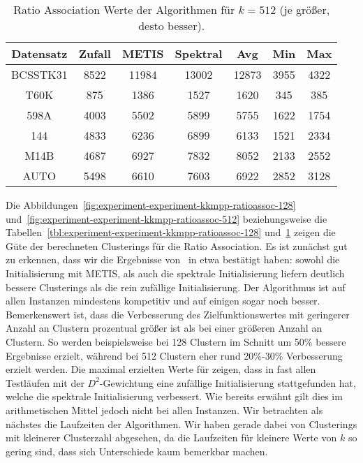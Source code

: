 \begin{table}[h!]
\centering
\begin{tabular}{@{}ccccccc@{}} \toprule
	\textbf{Datensatz} & \textbf{Zufall} & \textbf{METIS} & \textbf{Spektral} & \textbf{Avg} & \textbf{Min} & \textbf{Max} \\ \midrule
	BCSSTK31 	& 8522 & 11984 & 13002 & 12873 & 3955 & 4322 \\
	T60K 		& 875 & 1386 & 1527 & 1620 & 345 & 385 \\
	598A 		& 4003 & 5502 & 5899 & 5755 & 1622 & 1754 \\
	144 		& 4833 & 6236 & 6899 & 6133 & 1521 & 2334 \\
	M14B 		& 4687 & 6927 & 7832 & 8052 & 2133 & 2552 \\
	AUTO 		& 5498 & 6610 & 7603 & 6922 & 2852 & 3128 \\
	\bottomrule
\end{tabular}
\caption{Ratio Association Werte der Algorithmen für $k = 512$ (je größer, desto besser).}
\label{tbl:experiment-experiment-kkmpp-ratioassoc-512}
\end{table}

Die Abbildungen~\ref{fig:experiment-experiment-kkmpp-ratioassoc-128} und~\ref{fig:experiment-experiment-kkmpp-ratioassoc-512}
beziehungsweise die Tabellen~\ref{tbl:experiment-experiment-kkmpp-ratioassoc-128}
und~\ref{tbl:experiment-experiment-kkmpp-ratioassoc-512} zeigen die Güte der berechneten Clusterings für die Ratio Association.
Es ist zunächst gut zu erkennen, dass wir die Ergebnisse von~\cite{DhillonGK04} in etwa bestätigt haben: sowohl die
Initialisierung mit METIS, als auch die spektrale Initialisierung liefern deutlich bessere Clusterings als die rein zufällige
Initialisierung. Der Algorithmus \kkmpp{} ist auf allen Instanzen mindestens kompetitiv und auf einigen sogar noch besser.
Bemerkenswert ist, dass die Verbesserung des Zielfunktionswertes mit geringerer Anzahl an Clustern prozentual größer ist
als bei einer größeren Anzahl an Clustern. So werden beispielsweise bei 128 Clustern im Schnitt um 50\% bessere Ergebnisse
erzielt, während bei 512 Clustern eher rund 20\%-30\% Verbesserung erzielt werden. Die maximal erzielten Werte für
\kkmpp{} zeigen, dass in fast allen Testläufen mit der $D^2$-Gewichtung eine zufällige Initialisierung stattgefunden hat, welche
die spektrale Initialisierung verbessert. Wie bereits erwähnt gilt dies im arithmetischen Mittel jedoch nicht bei allen Instanzen.
\absatz
Wir betrachten als nächstes die Laufzeiten der Algorithmen. Wir haben gerade dabei von Clusterings
mit kleinerer Clusterzahl abgesehen, da die Laufzeiten für kleinere Werte von $k$ so gering sind, dass sich Unterschiede kaum
bemerkbar machen.
\phantom{Dieser Platz ist nötig, um die \LaTeX-Float-Umgebungen nicht zu verwirren!}

